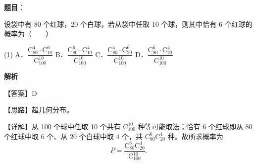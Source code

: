 \begin{answer}

\textbf{题目}：

设袋中有 80 个红球，20 个白球，若从袋中任取 10 个球，则其中恰有 6 个红球的概率为\mbox{（　　）}

\begin{gkopts}(1)
\task A．$\dfrac{\mathrm{C}_{80}^{4} \cdot \mathrm{C}_{10}^{6}}{\mathrm{C}_{100}^{10}}$
\task B．$\dfrac{\mathrm{C}_{80}^{6} \cdot \mathrm{C}_{10}^{4}}{\mathrm{C}_{100}^{10}}$
\task C．$\dfrac{\mathrm{C}_{80}^{4} \cdot \mathrm{C}_{20}^{6}}{\mathrm{C}_{100}^{10}}$
\task D．$\dfrac{\mathrm{C}_{80}^{6} \cdot \mathrm{C}_{20}^{4}}{\mathrm{C}_{100}^{10}}$
\end{gkopts}

\textbf{解析}

【答案】D

【思路】超几何分布。

【详解】从 100 个球中任取 10 个共有 $\mathrm{C}_{100}^{10}$ 种等可能取法；恰有 6 个红球即从 80 个红球中取 6 个、从 20 个白球中取 4 个，共 $\mathrm{C}_{80}^{6}\mathrm{C}_{20}^{4}$ 种。故所求概率为
\nopagebreak[4]
\[
P = \frac{\mathrm{C}_{80}^{6}\mathrm{C}_{20}^{4}}{\mathrm{C}_{100}^{10}}.
\]


\end{answer}
